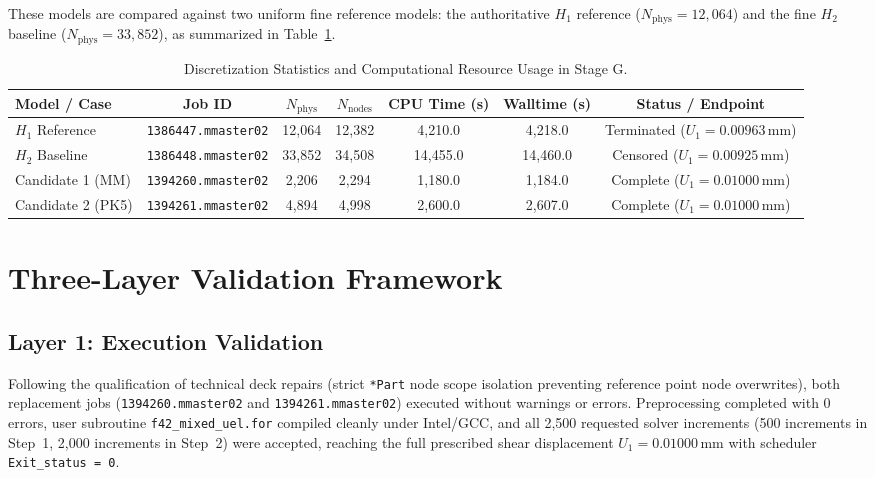 These models are compared against two uniform fine reference models: the authoritative $H_1$ reference ($N_{\mathrm{phys}} = 12,064$) and the fine $H_2$ baseline ($N_{\mathrm{phys}} = 33,852$), as summarized in Table~\ref{tab:stage_g_mesh_runtime_data}.

\begin{table}[htbp]
\centering
\small
\caption{Discretization Statistics and Computational Resource Usage in Stage G.}
\label{tab:stage_g_mesh_runtime_data}
\begin{tabular}{lcccccc}
\toprule
\textbf{Model / Case} & \textbf{Job ID} & $N_{\mathrm{phys}}$ & $N_{\mathrm{nodes}}$ & \textbf{CPU Time (s)} & \textbf{Walltime (s)} & \textbf{Status / Endpoint} \\
\midrule
$H_1$ Reference & \texttt{1386447.mmaster02} & 12,064 & 12,382 & 4,210.0 & 4,218.0 & Terminated ($U_1 = 0.00963\,\text{mm}$) \\
$H_2$ Baseline & \texttt{1386448.mmaster02} & 33,852 & 34,508 & 14,455.0 & 14,460.0 & Censored ($U_1 = 0.00925\,\text{mm}$) \\
Candidate 1 (MM) & \texttt{1394260.mmaster02} & 2,206 & 2,294 & 1,180.0 & 1,184.0 & Complete ($U_1 = 0.01000\,\text{mm}$) \\
Candidate 2 (PK5) & \texttt{1394261.mmaster02} & 4,894 & 4,998 & 2,600.0 & 2,607.0 & Complete ($U_1 = 0.01000\,\text{mm}$) \\
\bottomrule
\end{tabular}
\end{table}

\section{Three-Layer Validation Framework}

\subsection{Layer 1: Execution Validation}
Following the qualification of technical deck repairs (strict \texttt{*Part} node scope isolation preventing reference point node overwrites), both replacement jobs (\texttt{1394260.mmaster02} and \texttt{1394261.mmaster02}) executed without warnings or errors. Preprocessing completed with 0 errors, user subroutine \texttt{f42\_mixed\_uel.for} compiled cleanly under Intel/GCC, and all 2,500 requested solver increments (500 increments in Step~1, 2,000 increments in Step~2) were accepted, reaching the full prescribed shear displacement $U_1 = 0.01000\,\text{mm}$ with scheduler \texttt{Exit\_status = 0}.

